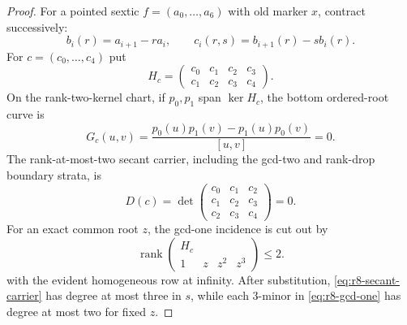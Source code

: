 \begin{proof}
For a pointed sextic
$f=(a_0,\ldots,a_6)$ with old marker $x$, contract successively:
\[
 b_i(r)=a_{i+1}-ra_i,\qquad
 c_i(r,s)=b_{i+1}(r)-sb_i(r).
\]
For $c=(c_0,\ldots,c_4)$ put
\[
 H_c=\begin{pmatrix}c_0&c_1&c_2&c_3\\
                     c_1&c_2&c_3&c_4\end{pmatrix}.
\]
On the rank-two-kernel chart, if $p_0,p_1$ span $\ker H_c$, the bottom
ordered-root curve is
\begin{equation}\label{eq:r8-bottom-cover}
 G_c(u,v)=
 \frac{p_0(u)p_1(v)-p_1(u)p_0(v)}{[u,v]}=0.
\end{equation}
The rank-at-most-two secant carrier, including the gcd-two and
rank-drop boundary strata, is
\begin{equation}\label{eq:r8-secant-carrier}
 D(c)=\det\begin{pmatrix}
 c_0&c_1&c_2\\c_1&c_2&c_3\\c_2&c_3&c_4
 \end{pmatrix}=0.
\end{equation}
For an exact common root $z$, the gcd-one incidence is cut out by
\begin{equation}\label{eq:r8-gcd-one}
 \operatorname{rank}
 \begin{pmatrix}H_c\\1&z&z^2&z^3\end{pmatrix}\leq2.
\end{equation}
with the evident homogeneous row at infinity.  After substitution,
\eqref{eq:r8-secant-carrier} has degree at most three in $s$, while
each $3$-minor in \eqref{eq:r8-gcd-one} has degree at most two for
fixed $z$.


\end{proof}
